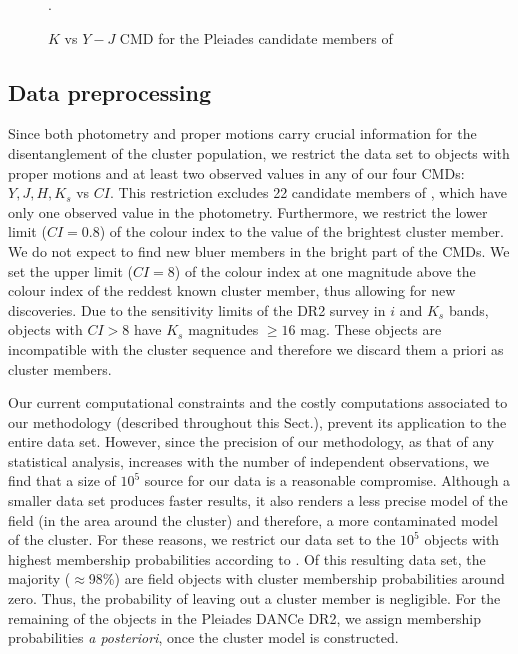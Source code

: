 \begin{figure}[htbp]
\begin{center}
\caption{$K$ vs $Y-J$ CMD for the Pleiades candidate members of \citet{Bouy2015}}.
\label{fig:otherCI}
\end{center}
\end{figure}

\subsection{Data preprocessing}
 Since both photometry and proper motions carry crucial information for the disentanglement of the cluster population, we restrict the data set to objects with proper motions and at least two observed values in any of our four CMDs: $Y,J,H,K_s$ vs $CI$. This restriction excludes 22 candidate members of \citet{Bouy2015}, which have only one observed value in the photometry. Furthermore, we restrict the lower limit ($CI =0.8$) of the colour index to the value of the brightest cluster member. We do not expect to find new bluer members in the bright part of the CMDs. We set the upper limit ($CI=8$) of the colour index at one magnitude above the colour index of the reddest known cluster member, thus allowing for new discoveries. Due to the sensitivity limits of the DR2 survey in $i$ and $K_s$ bands, objects with $CI>8$ have $K_s$ magnitudes $\geq 16$ mag. These objects are incompatible with the cluster sequence and therefore we discard them a priori as cluster members.

Our current computational constraints and the costly computations associated to our methodology (described throughout this Sect.), prevent its application to the entire data set. However, since the precision of our methodology, as that of any statistical analysis, increases with the number of independent observations, we find that a size of $10^5$ source for our data is a reasonable compromise. Although a smaller data set produces faster results, it also renders a less precise model of the field (in the area around the cluster) and therefore, a more contaminated model of the cluster. For these reasons, we restrict our data set to the $10^5$ objects with highest membership probabilities according to \citet{Bouy2015}. Of this resulting data set, the majority ($\approx$98\%) are field objects with cluster membership probabilities around zero. Thus, the probability of leaving out a cluster member is negligible. For the remaining of the objects in the Pleiades DANCe DR2, we assign membership probabilities \emph{a posteriori}, once the cluster model is constructed.



